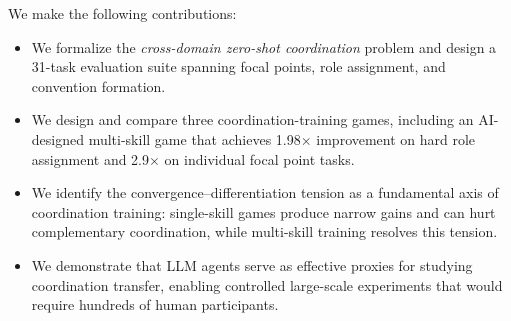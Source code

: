  We make the following contributions:
\begin{itemize}[leftmargin=*,itemsep=0pt,topsep=0pt]
\item We formalize the \emph{cross-domain zero-shot coordination} problem and design a 31-task evaluation suite spanning focal points, role assignment, and convention formation.
\item We design and compare three coordination-training games, including an AI-designed multi-skill game that achieves 1.98$\times$ improvement on hard role assignment and 2.9$\times$ on individual focal point tasks.
\item We identify the convergence--differentiation tension as a fundamental axis of coordination training: single-skill games produce narrow gains and can hurt complementary coordination, while multi-skill training resolves this tension.
\item We demonstrate that LLM agents serve as effective proxies for studying coordination transfer, enabling controlled large-scale experiments that would require hundreds of human participants.
\end{itemize}
